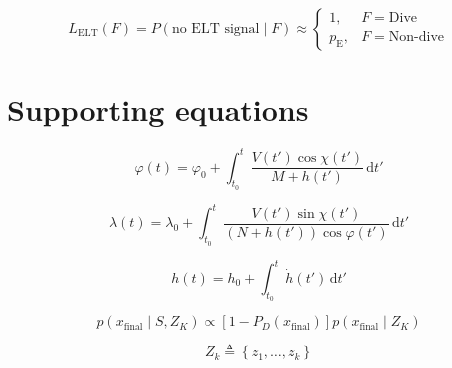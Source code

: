 \begin{equation}
  L_{\mathrm{ELT}}(F) = P\left(\text{no ELT signal} \mid F\right) \approx \begin{cases} 1, & F = \text{Dive} \\ p_{\mathrm{E}}, & F = \text{Non-dive} \end{cases}
  \label{eq:44}
\end{equation}


\appendix
\section{Supporting equations}
\setcounter{equation}{0}
\renewcommand{\theequation}{A\arabic{equation}}

\begin{equation}
  \varphi(t) = \varphi_{0} + \int_{t_{0}}^{t} \frac{V(t')\cos\chi(t')}{M+h(t')}\,\mathrm{d}t'
  \label{eq:A1}
\end{equation}

\begin{equation}
  \lambda(t) = \lambda_{0} + \int_{t_{0}}^{t} \frac{V(t')\sin\chi(t')}{\left(N+h(t')\right)\cos\varphi(t')}\,\mathrm{d}t'
  \label{eq:A2}
\end{equation}

\begin{equation}
  h(t) = h_{0} + \int_{t_{0}}^{t} \dot{h}(t')\,\mathrm{d}t'
  \label{eq:A3}
\end{equation}

\begin{equation}
  p\left(x_{\mathrm{final}} \mid S, Z_{K}\right) \propto \left[1 - P_{D}\left(x_{\mathrm{final}}\right)\right] p\left(x_{\mathrm{final}} \mid Z_{K}\right)
  \label{eq:A4}
\end{equation}

\begin{equation}
  Z_{k} \triangleq \left\{z_{1}, \ldots, z_{k}\right\}
  \label{eq:A5}
\end{equation}

